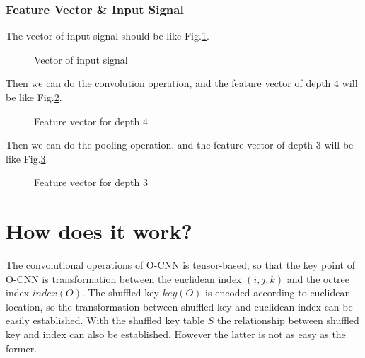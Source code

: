 \documentclass[border=0.5in]{blog}
\begin{document}
    
    \subsubsection{Feature Vector \& Input Signal}
    \label{sec:o-cnn-d:eg:fvnis}
    
    The vector of input signal should be like Fig.\ref{fig:o-cnn-d:eg:vis}.
    
    \begin{figure}
        \centering
        \caption{Vector of input signal}
        \label{fig:o-cnn-d:eg:vis}
    \end{figure}
    
    Then we can do the convolution operation, and the feature vector of depth $4$ will be like
    Fig.\ref{fig:o-cnn-d:eg:fv4}.
    
    \begin{figure}
        \centering
        \caption{Feature vector for depth $4$}
        \label{fig:o-cnn-d:eg:fv4}
    \end{figure}

    Then we can do the pooling operation, and the feature vector of depth $3$ will be like Fig.\ref{fig:o-cnn-d:eg:fv3}.
    
    \begin{figure}
        \centering
        \caption{Feature vector for depth $3$}
        \label{fig:o-cnn-d:eg:fv3}
    \end{figure}
    
    \section{How does it work?}
    \label{sec:o-cnn-work}
    
    The convolutional operations of O-CNN is tensor-based, so that the key point of O-CNN is
    transformation between the euclidean index $(i,j,k)$ and the octree index $index(O)$.
    The shuffled key $key(O)$ is encoded according to euclidean location, so the transformation
    between shuffled key and euclidean index can be easily established. With the shuffled key table $S$
    the relationship between shuffled key and index can also be established. However the latter
    is not as easy as the former.
    
\end{document}
